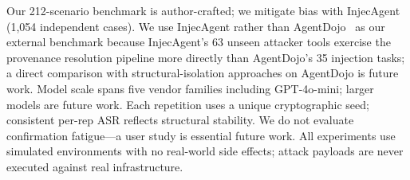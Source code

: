 Our 212-scenario benchmark is author-crafted; we mitigate bias with InjecAgent (1{,}054 independent cases). We use InjecAgent rather than AgentDojo~\cite{agentdojo2024} as our external benchmark because InjecAgent's 63 unseen attacker tools exercise the provenance resolution pipeline more directly than AgentDojo's 35 injection tasks; a direct comparison with structural-isolation approaches on AgentDojo is future work. Model scale spans five vendor families including GPT-4o-mini; larger models are future work. Each repetition uses a unique cryptographic seed; consistent per-rep ASR reflects structural stability. We do not evaluate confirmation fatigue---a user study is essential future work. All experiments use simulated environments with no real-world side effects; attack payloads are never executed against real infrastructure.
